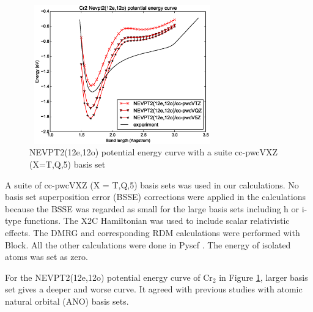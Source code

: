 \begin{figure}
  \includegraphics[width=8cm,height=6cm]{application/12o-nevpt2.eps}
  \caption{NEVPT2(12e,12o) potential energy curve with a suite cc-pwcVXZ (X=T,Q,5) basis set}
  \label{fig:12o_nevpt2}
\end{figure}

A suite of cc-pwcVXZ (X = T,Q,5) basis sets was used in our calculations. No basis set superposition error (BSSE) corrections were applied in the calculations because the BSSE was regarded as small for the large basis sets including h or i-type functions. The X2C Hamiltonian was used to include scalar relativistic effects. The DMRG and corresponding RDM calculations were performed with Block\cite{sharma_spin-adapted_2012}. All the other calculations were done in Pyscf \cite{sun_pyscf}.
The energy of isolated atoms was set as zero.

For the NEVPT2(12e,12o) potential energy curve of Cr$_2$ in Figure \ref{fig:12o_nevpt2}, larger basis set gives a deeper and worse curve. It agreed with previous studies with atomic natural orbital (ANO) basis sets.\cite{angeli_third-order_2006}

